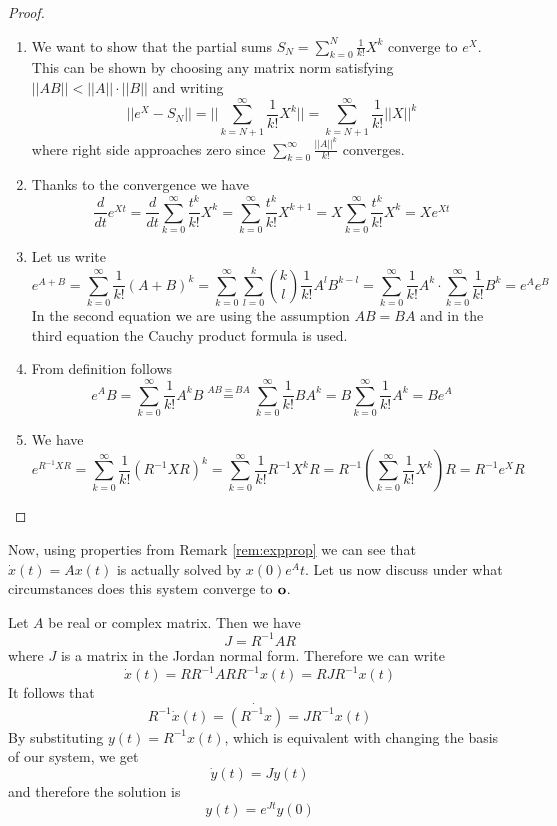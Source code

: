 \begin{proof}
	\begin{enumerate}
		\item We want to show that the partial sums $S_N=\sum^N_{k=0}\frac{1}{k!}X^k$ converge to $e^X$. This can be shown by choosing any matrix norm satisfying $||AB||<||A||\cdot||B||$ and writing $$||e^X-S_N||=||\sum^\infty_{k=N+1}\frac{1}{k!}X^k||=\sum^\infty_{k=N+1}\frac{1}{k!}||X||^k$$ where right side approaches zero since $\sum^\infty_{k=0}\frac{||A||^k}{k!}$ converges.

		\item Thanks to the convergence we have $$\frac{d}{dt}e^{Xt}=\frac{d}{dt}\sum^\infty_{k=0}\frac{t^k}{k!}X^{k}=\sum^\infty_{k=0}\frac{t^k}{k!}X^{k+1}=X\sum^\infty_{k=0}\frac{t^k}{k!}X^{k}=Xe^{Xt}$$

		\item Let us write $$e^{A+B}=\sum^\infty_{k=0}\frac{1}{k!}(A+B)^{k}=\sum^\infty_{k=0}\sum^k_{l=0}\binom{k}{l}\frac{1}{k!}A^{l}B^{k-l}=\sum^\infty_{k=0}\frac{1}{k!}A^{k}\cdot\sum^\infty_{k=0}\frac{1}{k!}B^{k}=e^{A}e^B$$ In the second equation we are using the assumption $AB=BA$ and in the third equation the Cauchy product formula is used.

		\item From definition follows $$e^{A}B=\sum^\infty_{k=0}\frac{1}{k!}A^{k}B\stackrel{AB=BA}{=}\sum^\infty_{k=0}\frac{1}{k!}BA^{k}=B\sum^\infty_{k=0}\frac{1}{k!}A^{k}=Be^{A}$$ 
		
		\item We have $$e^{R^{-1}XR}=\sum^\infty_{k=0}\frac{1}{k!}(R^{-1}XR)^{k}=\sum^\infty_{k=0}\frac{1}{k!}R^{-1}X^{k}R=R^{-1}(\sum^\infty_{k=0}\frac{1}{k!}X^{k})R=R^{-1}e^{X}R$$ 
	\end{enumerate}
\end{proof}

Now, using properties from Remark \ref{rem:expprop} we can see that $\dot{x}(t)=Ax(t)$ is actually solved by $x(0)e^At$. Let us now discuss under what circumstances does this system converge to $\textbf{o}$. 

Let $A$ be real or complex matrix. Then we have $$J=R^{-1}AR$$ where $J$ is a matrix in the Jordan normal form. Therefore we can write $$\dot{x}(t)=RR^{-1}ARR^{-1}x(t)=RJR^{-1}x(t)$$ It follows that $$R^{-1}\dot{x}(t)=\dot{(R^{-1}x)}=J R^{-1}x(t)$$ By substituting $y(t)=R^{-1}x(t)$, which is equivalent with changing the basis of our system, we get $$\dot{y}(t)=Jy(t)$$ and therefore the solution is $$y(t)=e^{Jt}y(0)$$ 

